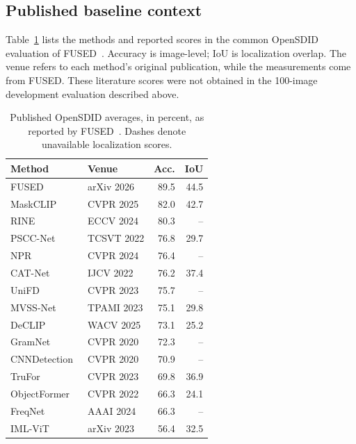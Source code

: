 \subsection{Published baseline context}
Table~\ref{tab:baselines} lists the methods and reported scores in the common OpenSDID evaluation of FUSED~\cite{fused}. Accuracy is image-level; IoU is localization overlap. The venue refers to each method's original publication, while the measurements come from FUSED. These literature scores were not obtained in the 100-image development evaluation described above.
\begin{table}[t]
\centering\small
\caption{Published OpenSDID averages, in percent, as reported by FUSED~\cite{fused}. Dashes denote unavailable localization scores.}
\label{tab:baselines}
\begin{tabular}{@{}llrr@{}}\toprule
Method & Venue & Acc. & IoU \\\midrule
FUSED~\cite{fused} & arXiv 2026 & 89.5 & 44.5 \\
MaskCLIP~\cite{opensdi} & CVPR 2025 & 82.0 & 42.7 \\
RINE~\cite{rine} & ECCV 2024 & 80.3 & -- \\
PSCC-Net~\cite{psccnet} & TCSVT 2022 & 76.8 & 29.7 \\
NPR~\cite{npr} & CVPR 2024 & 76.4 & -- \\
CAT-Net~\cite{catnet} & IJCV 2022 & 76.2 & 37.4 \\
UniFD~\cite{unifd} & CVPR 2023 & 75.7 & -- \\
MVSS-Net~\cite{mvss} & TPAMI 2023 & 75.1 & 29.8 \\
DeCLIP~\cite{declip} & WACV 2025 & 73.1 & 25.2 \\
GramNet~\cite{gramnet} & CVPR 2020 & 72.3 & -- \\
CNNDetection~\cite{cnnspot} & CVPR 2020 & 70.9 & -- \\
TruFor~\cite{trufor} & CVPR 2023 & 69.8 & 36.9 \\
ObjectFormer~\cite{objectformer} & CVPR 2022 & 66.3 & 24.1 \\
FreqNet~\cite{freqnet} & AAAI 2024 & 66.3 & -- \\
IML-ViT~\cite{imlvit} & arXiv 2023 & 56.4 & 32.5 \\\bottomrule
\end{tabular}
\end{table}

